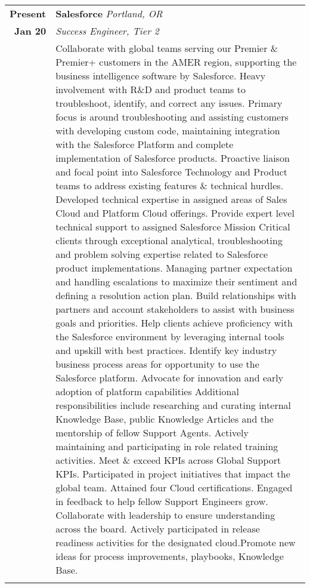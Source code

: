 \documentclass[article,10pt]{article}
\begin{document}
\begin{tabular}{r|p{17cm}}
 \textbf{Present} & \textbf{Salesforce} \sl{Portland, OR} \\ 
 \textbf{Jan \textquotesingle{}20} & \emph{Success Engineer, Tier 2}\\
  & \footnotesize{Collaborate with global teams serving our Premier \& Premier+ customers in the AMER region, supporting the business intelligence software by Salesforce. Heavy involvement with R\&D and product teams to troubleshoot, identify, and correct any issues. 
 \vspace{2mm}
 \newline Primary focus is around troubleshooting and assisting customers with developing custom code, maintaining integration with the Salesforce Platform and complete implementation of Salesforce products. 
 \newline Proactive liaison and focal point into Salesforce Technology and Product teams to address existing features \& technical hurdles. Developed technical expertise in assigned areas of Sales Cloud and Platform Cloud offerings. 
\vspace{2mm}
 \newline Provide expert level technical support to assigned Salesforce Mission Critical clients through exceptional analytical, troubleshooting and problem solving expertise related to Salesforce product implementations. 
 \newline Managing partner expectation and handling escalations to maximize their sentiment and defining a resolution action plan. Build relationships with partners and account stakeholders to assist with business goals and priorities. 
\vspace{2mm}
 \newline Help clients achieve proficiency with the Salesforce environment by leveraging internal tools and upskill with best practices.
 \newline Identify key industry business process areas for opportunity to use the Salesforce platform. Advocate for innovation and early adoption of platform capabilities
 \vspace{2mm}
 \newline Additional responsibilities include researching and curating internal Knowledge Base, public Knowledge Articles and the mentorship of fellow Support Agents. Actively maintaining and participating in role related training activities. Meet \& exceed KPIs across Global Support KPIs. 
 \newline Participated in project initiatives that impact the global team. Attained four Cloud certifications. Engaged in feedback to help fellow Support Engineers grow. Collaborate with leadership to ensure understanding across the board. Actively participated in release readiness activities for the designated cloud.Promote new ideas for process improvements, playbooks, Knowledge Base.}\\\multicolumn{2}{c}{}\\


\end{tabular}
\end{document}
